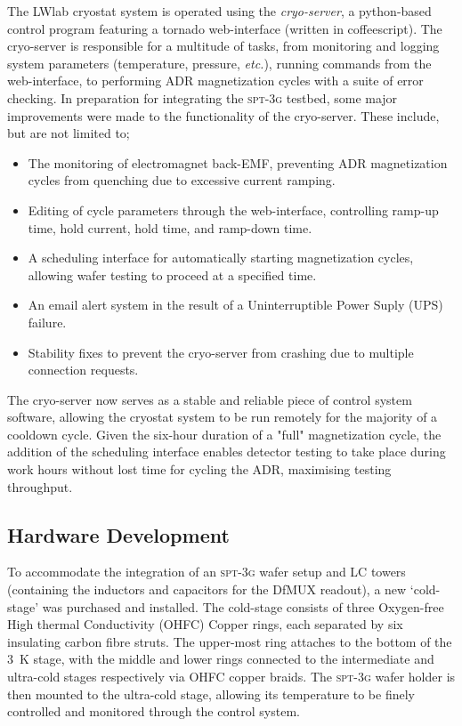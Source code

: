 \documentclass[iop]{emulateapj}
\begin{document}
The LWlab cryostat system is operated using the \textit{cryo-server}, a python-based control program featuring a tornado web-interface (written in coffeescript).  The cryo-server is responsible for a multitude of tasks, from monitoring and logging system parameters (temperature, pressure, \textit{etc.}), running commands from the web-interface, to performing ADR magnetization cycles with a suite of error checking.  In preparation for integrating the \textsc{spt-3g} testbed, some major improvements were made to the functionality of the cryo-server.  These include, but are not limited to;
\begin{itemize}[noitemsep,nolistsep]
	\item The monitoring of electromagnet back-EMF, preventing ADR magnetization cycles from quenching due to excessive current ramping.
	\item Editing of cycle parameters through the web-interface, controlling ramp-up time, hold current, hold time, and ramp-down time.
	\item A scheduling interface for automatically starting magnetization cycles, allowing wafer testing to proceed at a specified time.
	\item An email alert system in the result of a Uninterruptible Power Suply (UPS) failure.
	\item Stability fixes to prevent the cryo-server from crashing due to multiple connection requests.
\end{itemize}
The cryo-server now serves as a stable and reliable piece of control system software, allowing the cryostat system to be run remotely for the majority of a cooldown cycle.  Given the six-hour duration of a "full" magnetization cycle, the addition of the scheduling interface enables detector testing to take place during work hours without lost time for cycling the ADR, maximising testing throughput.

\subsection{Hardware Development}

To accommodate the integration of an \textsc{spt-3g} wafer setup and LC towers (containing the inductors and capacitors for the DfMUX readout), a new `cold-stage' was purchased and installed.  The cold-stage consists of three Oxygen-free High thermal Conductivity (OHFC) Copper rings, each separated by six insulating carbon fibre struts.  The upper-most ring attaches to the bottom of the 3~K stage, with the middle and lower rings connected to the intermediate and ultra-cold stages respectively via OHFC copper braids.  The \textsc{spt-3g} wafer holder is then mounted to the ultra-cold stage, allowing its temperature to be finely controlled and monitored through the control system.
\end{document}

